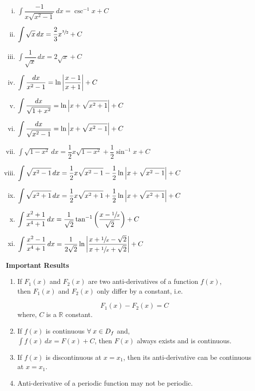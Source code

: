 \documentclass{article}
\begin{document}
\begin{enumerate}[i.]
    \item $\displaystyle\int \dfrac{-1}{x\displaystyle\sqrt{x^2-1}} \, dx=\csc^{-1}x+C$
    \item $\displaystyle\int \sqrt{x} \, dx=\dfrac{2}{3}x^{\sfrac{3}{2}}+C$
    \item $\displaystyle\int \dfrac{1}{\sqrt{x}} \, dx=2\sqrt{x}+C$
    \item $\displaystyle\int \dfrac{dx}{x^2-1}=\ln \abs{\dfrac{x-1}{x+1}}+C $
    \item $\displaystyle\int \dfrac{dx}{\sqrt{1+x^2}}=\ln \abs{x+\sqrt{x^2+1}}+C$
    \item $\displaystyle\int \dfrac{dx}{\sqrt{x^2-1}}=\ln \abs{x+\sqrt{x^2-1}}+C$
    \item $\displaystyle\int \sqrt{1-x^2} \, dx=\dfrac{1}{2}x\sqrt{1-x^2}+\dfrac{1}{2} \sin^{-1} x +C $
    \item $\displaystyle\int \sqrt{x^2-1} \, dx= \dfrac{1}{2}x\sqrt{x^2-1}-\dfrac{1}{2}\ln \abs{x+\sqrt{x^2-1}}+C $
    \item $\displaystyle\int \sqrt{x^2+1} \, dx=\dfrac{1}{2}x\sqrt{x^2+1}+\dfrac{1}{2}\ln \abs{x+\sqrt{x^2+1}}+C$
    \item $\displaystyle\int \dfrac{x^2+1}{x^4+1} \, dx=\dfrac{1}{\sqrt{2}}\tan^{-1}\left(\dfrac{x-\sfrac{1}{x}}{\sqrt{2}}\right)+C$
    \item $\displaystyle\int \dfrac{x^2-1}{x^4+1} \, dx=\dfrac{1}{2\sqrt{2}}\ln \abs{\dfrac{x+\sfrac{1}{x}- \sqrt{2}}{x+\sfrac{1}{x}+\sqrt{2}}}+C$

\end{enumerate}
\textbf{Important Results}
\begin{enumerate}
    \item If $F_{1}(x)$ and $F_{2}(x)$ are two anti-derivatives of a function $f(x)$, \\then $F_{1}(x) $ and $F_{2}(x) $ only differ by a constant, i.e.

          $$F_{1}(x) - F_{2}(x)=C$$
          where, $C$ is a $\mathbb{R}$ constant.
    \item If $f(x)$ is continuous $\forall \hspace{1mm} x \in D_{f}$ and,\\
          $\displaystyle\int f(x) \, dx=F(x)+C$, then $F(x)$ always exists and is continuous.
    \item If $f(x)$ is discontinuous at $x=x_{1}$, then its anti-derivative can be continuous at $x=x_{1}$.
    \item Anti-derivative of a periodic function may not be periodic.
\end{enumerate}
\end{document}
